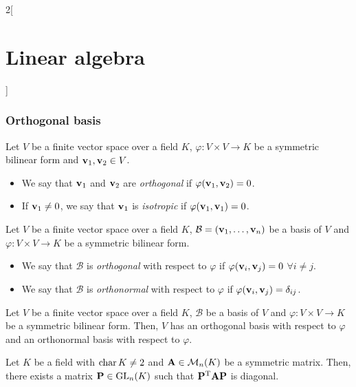 \documentclass[../../../main.tex]{subfiles}
\begin{document}
\begin{multicols}{2}[\section{Linear algebra}]
  \subsubsection{Orthogonal basis}
  \begin{definition}\label{LA_isotrop}
    Let $V$ be a finite vector space over a field $K$, $\varphi:V\times V\rightarrow K$ be a symmetric bilinear form and $\boldsymbol{\mathrm{v}}_1,\boldsymbol{\mathrm{v}}_2\in V$.
    \begin{itemize}
      \item We say that $\boldsymbol{\mathrm{v}}_1$ and $\boldsymbol{\mathrm{v}}_2$ are \emph{orthogonal} if $\varphi(\boldsymbol{\mathrm{v}}_1,\boldsymbol{\mathrm{v}}_2)=0$.
      \item If $\boldsymbol{\mathrm{v}}_1\ne 0$, we say that $\boldsymbol{\mathrm{v}}_1$ is \emph{isotropic} if $\varphi(\boldsymbol{\mathrm{v}}_1,\boldsymbol{\mathrm{v}}_1)=0$.
    \end{itemize}
  \end{definition}
  \begin{definition}
    Let $V$ be a finite vector space over a field $K$, $\mathcal{B}=(\boldsymbol{\mathrm{v}}_1,\ldots,\boldsymbol{\mathrm{v}}_n)$ be a basis of $V$ and $\varphi:V\times V\rightarrow K$ be a symmetric bilinear form.
    \begin{itemize}
      \item We say that $\mathcal{B}$ is \emph{orthogonal} with respect to $\varphi$ if $\varphi(\boldsymbol{\mathrm{v}}_i,\boldsymbol{\mathrm{v}}_j)=0$ $\forall i\ne j$.
      \item We say that $\mathcal{B}$ is \emph{orthonormal} with respect to $\varphi$ if $\varphi(\boldsymbol{\mathrm{v}}_i,\boldsymbol{\mathrm{v}}_j)=\delta_{ij}$.
    \end{itemize}
  \end{definition}
  \begin{theorem}
    Let $V$ be a finite vector space over a field $K$, $\mathcal{B}$ be a basis of $V$ and $\varphi:V\times V\rightarrow K$ be a symmetric bilinear form. Then, $V$ has an orthogonal basis with respect to $\varphi$ and an orthonormal basis with respect to $\varphi$.
  \end{theorem}
  \begin{corollary}
    Let $K$ be a field with $\operatorname{char} K\ne 2$ and $\boldsymbol{\mathrm{A}}\in\mathcal{M}_n(K)$ be a symmetric matrix. Then, there exists a matrix $\boldsymbol{\mathrm{P}}\in\mathrm{GL}_n(K)$ such that $\vb{P}^{\mathrm{T}}\boldsymbol{\mathrm{A}}\boldsymbol{\mathrm{P}}$ is diagonal.
  \end{corollary}

\end{multicols}
\end{document}
